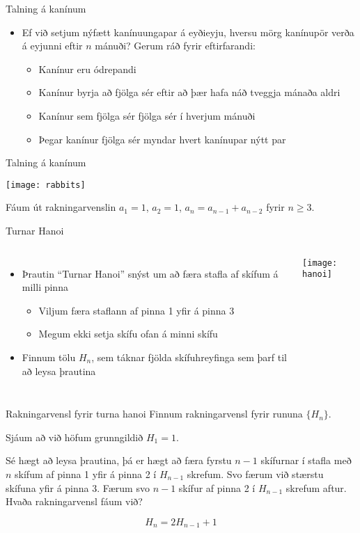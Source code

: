 \documentclass[handout]{beamer}
\begin{document}
\begin{frame}{Talning á kanínum}
 \begin{itemize}
  \item Ef við setjum nýfætt kanínuungapar á eyðieyju, hversu mörg kanínupör verða á eyjunni eftir $n$ mánuði? Gerum ráð fyrir eftirfarandi:
  \begin{itemize}
   \item Kanínur eru ódrepandi
   \item Kanínur byrja að fjölga sér eftir að þær hafa náð tveggja mánaða aldri
   \item Kanínur sem fjölga sér fjölga sér í hverjum mánuði
   \item Þegar kanínur fjölga sér myndar hvert kanínupar nýtt par
  \end{itemize}
 \end{itemize}
\end{frame}

\begin{frame}{Talning á kanínum}

\begin{center}
\texttt{[image: rabbits]}
\end{center}
Fáum út rakningarvenslin $a_1 = 1$, $a_2 = 1$, $a_n = a_{n-1} + a_{n-2}$ fyrir $n \geq 3$.
\end{frame}

\begin{frame}{Turnar Hanoi}
\begin{columns}
\begin{itemize}
 \item Þrautin ``Turnar Hanoi'' snýst um að færa stafla af skífum á milli pinna
 \begin{itemize}
  \item Viljum færa staflann af pinna 1 yfir á pinna 3
  \item Megum ekki setja skífu ofan á minni skífu
 \end{itemize}
 \item Finnum tölu $H_n$, sem táknar fjölda skífuhreyfinga sem þarf til að leysa þrautina
\end{itemize}
\texttt{[image: hanoi]}
\end{columns}
\end{frame}

\begin{frame}{Rakningarvensl fyrir turna hanoi}
Finnum rakningarvensl fyrir rununa $\{H_n\}$. \pause

Sjáum að við höfum grunngildið $H_1 = 1$. \pause

Sé hægt að leysa þrautina, þá er hægt að færa fyrstu $n-1$ skífurnar í stafla með $n$ skífum af pinna 1 yfir á pinna 2 í $H_{n-1}$ skrefum. Svo færum við stærstu skífuna yfir á pinna 3. Færum svo $n-1$ skífur af pinna 2 í $H_{n-1}$ skrefum aftur. Hvaða rakningarvensl fáum við? \pause

\[
 H_n = 2H_{n-1} +1
\]
\end{frame}
\end{document}
